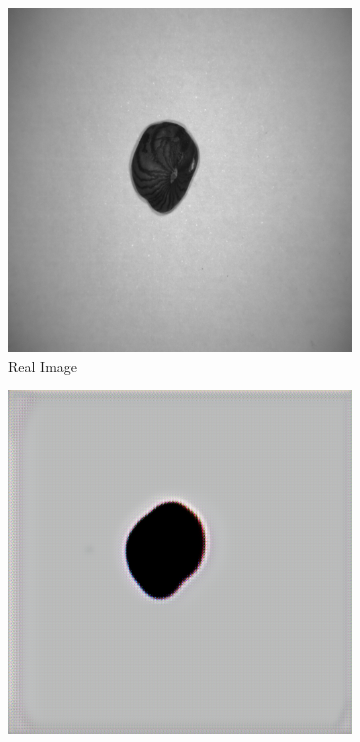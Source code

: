 \documentclass[12pt,DIV14,BCOR12mm,a4paper,footinclude=false,headinclude,parskip=half-,twoside,openright,cleardoublepage=empty,toc=index,bibliography=totoc,listof=totoc]{scrreprt}
\numberwithin{equation}{chapter}
\begin{document}
\begin{figure}
    \begin{minipage}[H]{\linewidth}
        \centering
        \begin{minipage}[H]{0.5\linewidth} %
            \centering
            \begin{subfigure}[t]{0.48\linewidth}
                \centering
                \includegraphics[width=\linewidth]{../media/CycleGAN_real.png}
                \caption{Real Image}
            \end{subfigure}%
            \hfill
            \begin{subfigure}[t]{0.48\linewidth}
                \centering
                \includegraphics[width=\linewidth]{../media/CycleGAN_generated.png}

\end{subfigure}
\end{minipage}
\end{minipage}
\end{figure}
\end{document}
